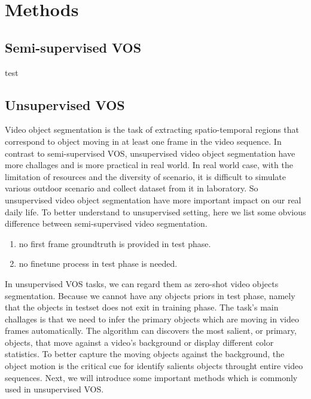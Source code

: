 \section{Methods}

\subsection{Semi-supervised VOS}
test






\subsection{Unsupervised VOS}
Video object segmentation is the task of extracting spatio-temporal regions that correspond to object moving in at
least one frame in the video sequence. In contrast to semi-supervised VOS, unsupervised video object segmentation have 
more challages and is more practical in real world. In real world case, with the limitation of resources and the diversity of scenario,
it is difficult to simulate various outdoor scenario and collect dataset from it in laboratory. So unsupervised video object 
segmentation have more important impact on our real daily life. To better understand to unsupervised setting, here we list some
obvious difference between semi-supervised video segmentation.
\begin{enumerate}
    \item no first frame groundtruth is provided in test phase.
    \item no finetune process in test phase is needed.
\end{enumerate}

In unsupervised VOS tasks, we can regard them as zero-shot video objects segmentation. Because we cannot have any objects priors
in test phase, namely that the objects in testset does not exit in training phase. The task's main challages is that we need to infer
the primary objects which are moving in video frames automatically. The algorithm can discovers the most salient, or primary, objects,
that move against a video's background or display different color statistics. To better capture the moving objects against the background,
the object motion is the critical cue for identify salients objects throught entire video sequences. Next, we will introduce some important
methods which is commonly used in unsupervised VOS.

